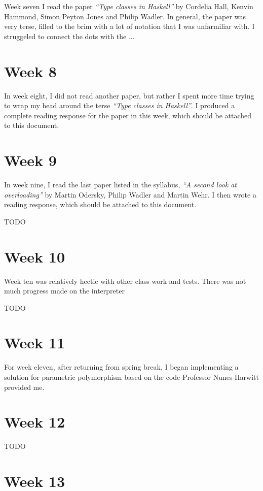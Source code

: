 \documentclass[11pt,a4paper]{article}
\begin{document}
Week seven I read the paper \textit{``Type classes in Haskell''} by Cordelia Hall,
Kenvin Hammond, Simon Peyton Jones and Philip Wadler. In general, the paper was
very terse, filled to the brim with a lot of notation that I was unfarmiliar with.
I struggeled to connect the dots with the ...

\section*{Week 8}

In week eight, I did not read another paper, but rather I spent more time trying
to wrap my head around the terse \textit{``Type classes in Haskell''}. I produced
a complete reading response for the paper in this week, which should be attached
to this document.

\section*{Week 9}

In week nine, I read the last paper listed in the syllabus, \textit{``A second
look at overloading''} by Martin Odersky, Philip Wadler and Martin Wehr. I then
wrote a reading response, which should be attached to this document.

TODO

\section*{Week 10}

Week ten was relatively hectic with other class work and tests. There was not
much progress made on the interpreter

TODO

\section*{Week 11}

For week eleven, after returning from spring break, I began implementing a
solution for parametric polymorphism based on the code Professor Nunes-Harwitt
provided me.

\section*{Week 12}

TODO

\section*{Week 13}
\end{document}
